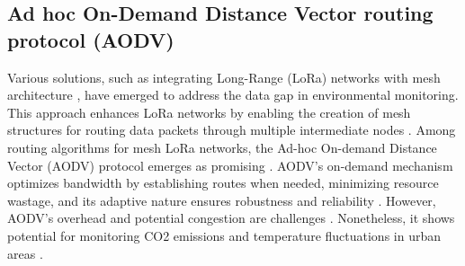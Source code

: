 


\subsection{Ad hoc On-Demand Distance Vector routing protocol (AODV)}\label{sec:lr_aodv}

Various solutions, such as integrating Long-Range (LoRa) networks with mesh architecture \cite{8326735, s21134314}, have emerged to address the data gap in environmental monitoring. This approach enhances LoRa networks by enabling the creation of mesh structures for routing data packets through multiple intermediate nodes \cite{8324573}. Among routing algorithms for mesh LoRa networks, the Ad-hoc On-demand Distance Vector (AODV) protocol emerges as promising \cite{BELDINGROYER2003125}. AODV's on-demand mechanism optimizes bandwidth by establishing routes when needed, minimizing resource wastage, and its adaptive nature ensures robustness and reliability \cite{10.1145/313451.313538}. However, AODV's overhead and potential congestion are challenges \cite{Bhardwaj_2020}. Nonetheless, it shows potential for monitoring CO2 emissions and temperature fluctuations in urban areas \cite{8326735, s21134314}.

